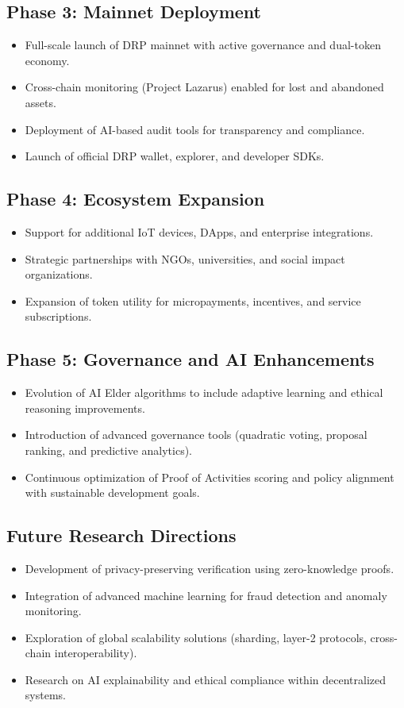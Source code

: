 \documentclass[11pt,a4paper]{article}
\begin{document}
\subsection{Phase 3: Mainnet Deployment}
\begin{itemize}
    \item Full-scale launch of DRP mainnet with active governance and dual-token economy.  
    \item Cross-chain monitoring (Project Lazarus) enabled for lost and abandoned assets.  
    \item Deployment of AI-based audit tools for transparency and compliance.  
    \item Launch of official DRP wallet, explorer, and developer SDKs.  
\end{itemize}

\subsection{Phase 4: Ecosystem Expansion}
\begin{itemize}
    \item Support for additional IoT devices, DApps, and enterprise integrations.  
    \item Strategic partnerships with NGOs, universities, and social impact organizations.  
    \item Expansion of token utility for micropayments, incentives, and service subscriptions.  
\end{itemize}

\subsection{Phase 5: Governance and AI Enhancements}
\begin{itemize}
    \item Evolution of AI Elder algorithms to include adaptive learning and ethical reasoning improvements.  
    \item Introduction of advanced governance tools (quadratic voting, proposal ranking, and predictive analytics).  
    \item Continuous optimization of Proof of Activities scoring and policy alignment with sustainable development goals.  
\end{itemize}

\subsection{Future Research Directions}
\begin{itemize}
    \item Development of privacy-preserving verification using zero-knowledge proofs.  
    \item Integration of advanced machine learning for fraud detection and anomaly monitoring.  
    \item Exploration of global scalability solutions (sharding, layer-2 protocols, cross-chain interoperability).  
    \item Research on AI explainability and ethical compliance within decentralized systems.  
\end{itemize}
\end{document}
